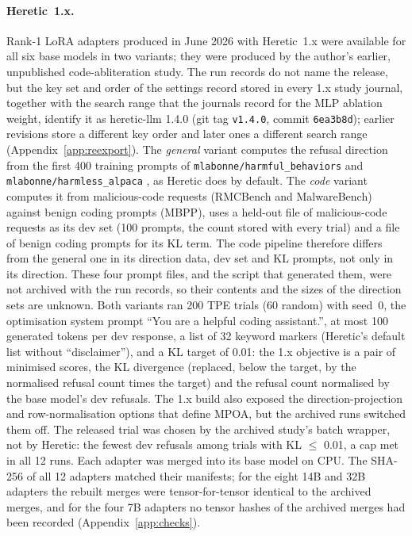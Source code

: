 \paragraph{Heretic~1.x.} Rank-1 LoRA adapters \cite{hu2022lora} produced in June 2026 with Heretic~1.x
\cite{heretic2025} were available for all six base models in two variants; they were produced by the author's earlier, unpublished
code-abliteration study. The run records do not name the release,
but the key set and order of the settings record stored in every 1.x study journal, together with the search range
that the journals record for the MLP ablation weight, identify it as heretic-llm 1.4.0 (git tag \texttt{v1.4.0},
commit \texttt{6ea3b8d}); earlier revisions store a different key order and later ones a different search range
(Appendix~\ref{app:reexport}). The \emph{general} variant computes the refusal direction from the first 400
training prompts of \texttt{mlabonne/harmful\_behaviors} and \texttt{mlabonne/harmless\_alpaca}
\cite{zou2023universal,taori2023alpaca}, as Heretic does by default. The \emph{code} variant computes it from
malicious-code requests (RMCBench and MalwareBench) against benign coding prompts (MBPP), uses a held-out file of
malicious-code requests as its dev set (100 prompts, the count stored with every trial) and a file of benign coding
prompts for its KL term. The code pipeline therefore differs from the general one in its direction data, dev set
and KL prompts, not only in its direction. These four prompt files, and the script that generated them, were not archived with the
run records, so their contents and the sizes of the direction sets are unknown. Both variants ran 200 TPE trials (60 random) with
seed~0, the optimisation system prompt ``You are a helpful coding assistant.'', at most 100 generated tokens per dev
response, a list of 32 keyword markers (Heretic's default list without ``disclaimer''), and a KL target of 0.01:
the 1.x objective is a pair of minimised scores, the KL divergence (replaced, below the target, by the normalised
refusal count times the target) and the refusal count normalised by the base model's dev refusals. The 1.x build also exposed the
direction-projection and row-normalisation options that define MPOA, but the archived runs switched them off. The
released trial was chosen by the archived study's batch wrapper, not by Heretic: the fewest dev refusals among trials
with KL $\le$ 0.01, a cap met in all 12 runs. Each adapter was merged into its base model on CPU. The SHA-256 of all
12 adapters matched their manifests; for the eight 14B and 32B adapters the rebuilt merges were tensor-for-tensor
identical to the archived merges, and for the four 7B adapters no tensor hashes of the archived merges had been
recorded (Appendix~\ref{app:checks}).

